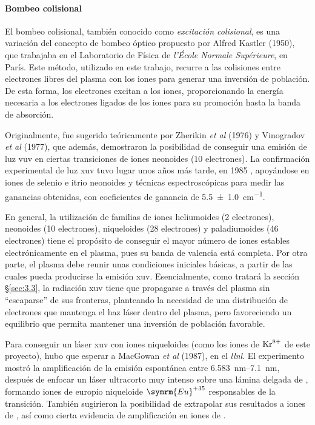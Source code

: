\paragraph{Bombeo colisional}
El bombeo colisional, también conocido como \emph{excitación colisional}, es una variación del concepto de bombeo óptico propuesto por Alfred Kastler (1950)\autocite{Kastler1950}, que trabajaba en el Laboratorio de Física de \emph{l’École Normale Supérieure}, en París. Este método, utilizado en este trabajo, recurre a las colisiones entre electrones libres del plasma con los iones para generar una inversión de población. De esta forma, los electrones excitan a los iones, proporcionando la energía necesaria a los electrones ligados de los iones para su promoción hasta la banda de absorción.

Originalmente, fue sugerido teóricamente por Zherikin \emph{et al} (1976) y Vinogradov \emph{et al} (1977), que además, demostraron la posibilidad de conseguir una emisión de luz \acrshort{vuv} en ciertas transiciones de iones neonoides ($10$ electrones). La confirmación experimental de luz \acrshort{xuv} tuvo lugar unos años más tarde, en 1985 \autocite{Matthews1985,Rosen1985}, apoyándose en iones de selenio e itrio neonoides y técnicas espectroscópicas para medir las ganancias obtenidas, con coeficientes de ganancia de \qty{5.5 +-  1.0}{cm^{-1}}.

En general, la utilización de familias de iones heliumoides (2 electrones), neonoides (10 electrones), niqueloides (28 electrones) y paladiumoides (46 electrones) tiene el propósito de conseguir el mayor número de iones estables electrónicamente en el plasma, pues su banda de valencia está completa. Por otra parte, el plasma debe reunir unas condiciones iniciales básicas, a partir de las cuales pueda producirse la emisión \acrshort{xuv}. Esencialmente, como tratará la sección \S\ref{sec:3.3}, la radiación \acrshort{xuv} tiene que propagarse a través del plasma sin \enquote{escaparse} de sus fronteras, planteando la necesidad de una distribución de electrones que mantenga el haz láser dentro del plasma, pero favoreciendo un equilibrio que permita mantener una inversión de población favorable.

Para conseguir un láser \acrshort{xuv} con iones niqueloides (como los iones de $\ce{Kr^{8+}}$ de este proyecto), hubo que esperar a MacGowan \emph{et al} (1987)\autocite{MacGowan1987}, en el \emph{\acrfull{llnl}}. El experimento mostró la amplificación de la emisión espontánea entre \qtyrange{6.583}{7.1}{nm}, después de enfocar un láser ultracorto muy intenso sobre una lámina delgada de , formando iones de europio niqueloide $\symrm{Eu}^{+35}$ responsables de la transición. También sugirieron la posibilidad de extrapolar sus resultados a iones de , así como cierta evidencia de amplificación en iones de .

